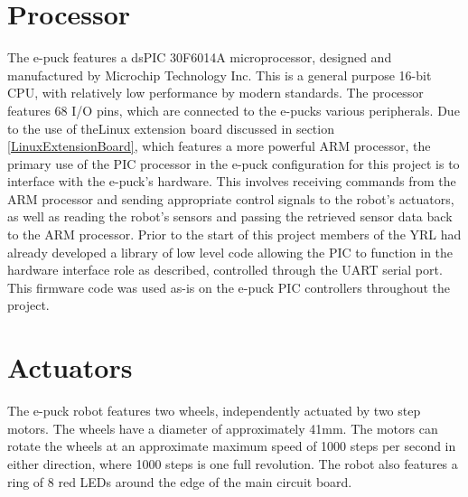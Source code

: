 
\section{Processor}
The e-puck features a dsPIC 30F6014A microprocessor, designed and manufactured by Microchip Technology Inc. This is a general purpose 16-bit CPU, with relatively low performance by modern standards. The processor features 68 I/O pins, which are connected to the e-pucks various peripherals. Due to the use of theLinux extension board discussed in section \ref{LinuxExtensionBoard}, which features a more powerful ARM processor, the primary use of the PIC processor in the e-puck configuration for this project is to interface with the e-puck's hardware. This involves receiving commands from the ARM processor and sending appropriate control signals to the robot's actuators, as well as reading the robot's sensors and passing the retrieved sensor data back to the ARM processor. Prior to the start of this project members of the YRL had already developed a library of low level code allowing the PIC to function in the hardware interface role as described, controlled through the UART serial port. This firmware code was used as-is on the e-puck PIC controllers throughout the project.


\section{Actuators}
The e-puck robot features two wheels, independently actuated by two step motors. The wheels have a diameter of approximately 41mm. The motors can rotate the wheels at an approximate maximum speed of 1000 steps per second in either direction, where 1000 steps is one full revolution. The robot also features a ring of 8 red LEDs around the edge of the main circuit board. 


